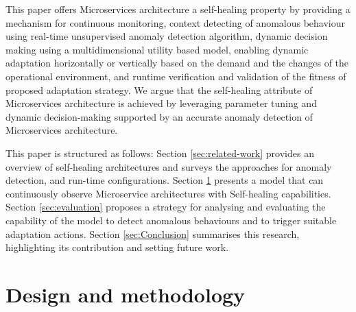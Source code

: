 \documentclass[graybox]{svmult}
\begin{document}

This paper offers Microservices architecture a self-healing property by providing a mechanism for continuous monitoring, context detecting of anomalous behaviour using real-time unsupervised anomaly detection algorithm, dynamic decision making using a multidimensional utility based model, enabling dynamic adaptation horizontally or vertically based on the demand and the changes of the operational environment, and runtime verification and validation of the fitness of proposed adaptation strategy. We argue that the self-healing attribute of Microservices architecture is achieved by leveraging parameter tuning and dynamic decision-making supported by an accurate anomaly detection of Microservices architecture. 

This paper is structured as follows: Section \ref{sec:related-work} provides an overview of self-healing architectures and surveys the approaches for  anomaly detection, and run-time configurations. Section \ref{sec:modelling} presents a model that can continuously observe Microservice architectures with Self-healing capabilities. Section \ref{sec:evaluation} proposes a strategy for analysing and evaluating the capability of the model  to detect anomalous behaviours and to trigger suitable adaptation actions. Section \ref{sec:Conclusion} summarises this research, highlighting its contribution and setting future work.



\section{Design and methodology}
\label{sec:modelling}
\end{document}
